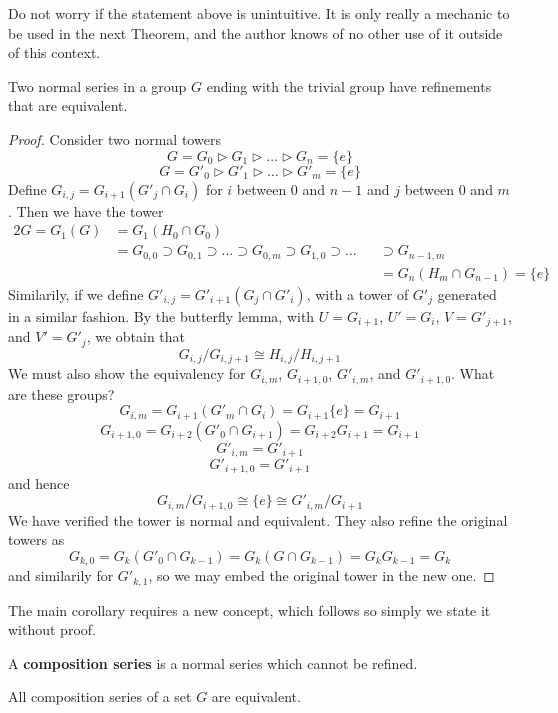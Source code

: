 Do not worry if the statement above is unintuitive. It is only really a mechanic to be used in the next Theorem, and the author knows of no other use of it outside of this context.

\begin{theorem}[Shreier]
    Two normal series in a group $G$ ending with the trivial group have refinements that are equivalent.
\end{theorem}
\begin{proof}
    Consider two normal towers
    \[ G = G_0 \rhd G_1 \rhd \dots \rhd G_n = \{ e \} \]
    \[ G = G'_0 \rhd G'_1 \rhd \dots \rhd G'_m = \{ e \} \]
    Define $G_{i,j} = G_{i+1}(G'_j \cap G_i)$ for $i$ between 0 and $n-1$ and $j$ between 0 and $m$. Then we have the tower
    \begin{alignat*}{2}
    G = G_1(G) &= G_1(H_0 \cap G_0) &\\
               &= G_{0,0} \supset G_{0,1} \supset \dots \supset G_{0,m} \supset G_{1,0} \supset \dots &&\supset G_{n-1,m}\\
                &           &&= G_n(H_m \cap G_{n-1}) = \{ e \}
    \end{alignat*}
    Similarily, if we define $G'_{i,j} = G'_{i+1}(G_j \cap G'_i)$, with a tower of $G'_j$ generated in a similar fashion. By the butterfly lemma, with $U = G_{i+1}$, $U' = G_i$, $V = G'_{j+1}$, and $V' = G'_j$, we obtain that
    \[ G_{i,j}/G_{i,j+1} \cong H_{i,j}/H_{i,j+1} \]
    We must also show the equivalency for $G_{i,m}$, $G_{i+1,0}$, $G'_{i,m}$, and $G'_{i+1,0}$. What are these groups?
    \[ G_{i,m} = G_{i+1}(G'_m \cap G_i) = G_{i+1}\{e\} = G_{i+1} \]
    \[ G_{i+1,0} = G_{i+2}(G'_0 \cap G_{i+1}) = G_{i+2}G_{i+1} = G_{i+1} \]
    \[ G'_{i,m} = G'_{i+1} \]
    \[ G'_{i+1,0} = G'_{i+1} \]
    and hence
    \[ G_{i,m}/G_{i+1,0} \cong \{e\} \cong G'_{i,m}/G_{i+1} \]
    We have verified the tower is normal and equivalent. They also refine the original towers as
    \[ G_{k,0} = G_k(G'_0 \cap G_{k-1}) = G_k(G \cap G_{k-1}) = G_kG_{k-1} = G_k \]
    and similarily for $G'_{k,1}$, so we may embed the original tower in the new one.
\end{proof}

The main corollary requires a new concept, which follows so simply we state it without proof.

A {\bf composition series} is a normal series which cannot be refined.

\begin{corollary}
    All composition series of a set $G$ are equivalent.
\end{corollary}

